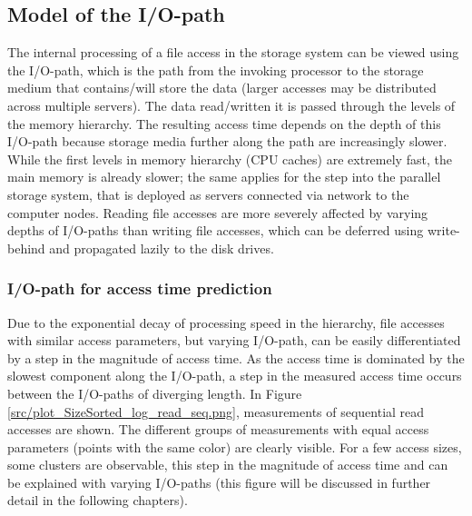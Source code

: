 \documentclass{superfri}
\begin{document}
\subsection{Model of the I/O-path}
The internal processing of a file access in the storage system can be viewed using the I/O-path, which is the path from the invoking processor to the storage medium that contains/will store the data (larger accesses may be distributed across multiple servers). 
The data read/written it is passed through the levels of the memory hierarchy.
The resulting access time depends on the depth of this I/O-path because storage media further along the path are increasingly slower.
While the first levels in memory hierarchy (CPU caches) are extremely fast, the main memory is already slower; the same applies for the step into the parallel storage system, that is deployed as servers connected via network to the computer nodes.
Reading file accesses are more severely affected by varying depths of I/O-paths than writing file accesses, which can be deferred using write-behind and propagated lazily to the disk drives.

\subsubsection{I/O-path for access time prediction}
\label{sec:path_for_pred}
Due to the exponential decay of processing speed in the hierarchy, file accesses with similar access parameters, but varying I/O-path, can be easily differentiated by a step in the magnitude of access time.
As the access time is dominated by the slowest component along the I/O-path, a step in the measured access time occurs between the  I/O-paths of diverging length.
In Figure\,\ref{src/plot_SizeSorted_log_read_seq.png}, measurements of sequential read accesses are shown.
The different groups of measurements with equal access parameters (points with the same color) are clearly visible.
For a few access sizes, some clusters are observable, this step in the magnitude of access time and can be explained with varying I/O-paths (this figure will be discussed in further detail in the following chapters).
\end{document}
